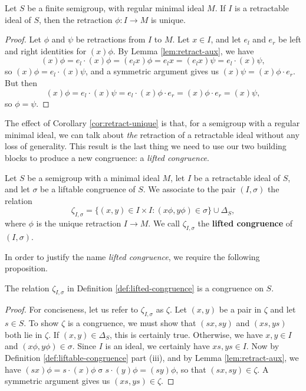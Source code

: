 \begin{corollary}
  \label{cor:retract-unique}
  Let $S$ be a finite semigroup, with regular minimal ideal $M$.  If $I$ is a
  retractable ideal of $S$, then the retraction $\phi:I \to M$ is unique.
  \begin{proof}
    Let $\phi$ and $\psi$ be retractions from $I$ to $M$.  Let $x \in I$,
    and let $e_l$ and $e_r$ be left and right identities for $(x)\phi$.  By
    Lemma \ref{lem:retract-aux}, we have
    $$(x)\phi
    = e_l \cdot (x)\phi
    = (e_lx)\phi
    = e_lx
    = (e_lx)\psi
    = e_l \cdot (x)\psi,$$
    so $(x)\phi = e_l \cdot (x)\psi$, and a symmetric argument gives us
    $(x)\psi = (x)\phi \cdot e_r$.  But then
    $$(x)\phi
    = e_l \cdot (x)\psi
    = e_l \cdot (x)\phi \cdot e_r
    = (x)\phi \cdot e_r
    = (x)\psi,$$
    so $\phi = \psi$.
  \end{proof}
\end{corollary}

The effect of Corollary \ref{cor:retract-unique} is that, for a semigroup with a
regular minimal ideal, we can talk about \textit{the} retraction of a
retractable ideal without any loss of generality.  This result is the last thing
we need to use our two building blocks to produce a new congruence: a
\textit{lifted congruence}.

\begin{definition}
  \label{def:lifted-congruence}
  Let $S$ be a semigroup with a minimal ideal $M$, let $I$ be a retractable
  ideal of $S$, and let $\sigma$ be a liftable congruence of $S$.  We associate
  to the pair $(I,\sigma)$ the relation
  $$\zeta_{I,\sigma}
  = \{(x,y) \in I \times I : (x\phi,y\phi) \in \sigma\} \cup \Delta_S,$$
  where $\phi$ is the unique retraction $I \to M$.
  We call $\zeta_{I,\sigma}$ the \textbf{lifted congruence} of $(I,\sigma)$.
\end{definition}

In order to justify the name \textit{lifted congruence}, we require the
following proposition.

\begin{theorem}
  \label{thm:lifted-congruence}
  The relation $\zeta_{I,\sigma}$ in Definition \ref{def:lifted-congruence} is a
  congruence on $S$.
  \begin{proof}
    For conciseness, let us refer to $\zeta_{I,\sigma}$ as $\zeta$.  Let $(x,y)$
    be a pair in $\zeta$ and let $s \in S$.  To show $\zeta$ is a congruence, we
    must show that $(sx,sy)$ and $(xs,ys)$ both lie in $\zeta$.  If
    $(x,y) \in \Delta_S$, this is certainly true.  Otherwise, we have
    $x, y \in I$ and $(x\phi, y\phi) \in \sigma$.  Since $I$ is an ideal, we
    certainly have $xs,ys\in I$.  Now by Definition
    \ref{def:liftable-congruence} part (iii), and by Lemma
    \ref{lem:retract-aux}, we have
    $(sx)\phi = s \cdot (x)\phi \mathrel\sigma s \cdot (y)\phi = (sy)\phi$, so
    that $(sx, sy) \in \zeta$.  A symmetric argument gives us
    $(xs,ys) \in \zeta$.
  \end{proof}
\end{theorem}

